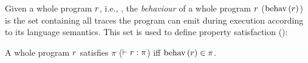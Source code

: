 \documentclass[utf8,acmsmall,review,screen,dvipsnames]{acmart}
\begin{document}


Given a whole program $r$, i.e., , the {\em behaviour} of a whole program $r$ ($\operatorname{behav}\left({r}\right)$) is the set containing all traces the program can emit during execution according to its language semantics.
This set is used to define property satisfaction ():

\begin{definition}[Satisfaction]\label{def:propsat}
  A whole program $r$ satisfies $\pi$ ($\vdash{r}:{\pi}$) iff $\operatorname{behav}\left({r}\right)\in\pi$.
\end{definition}
\end{document}
